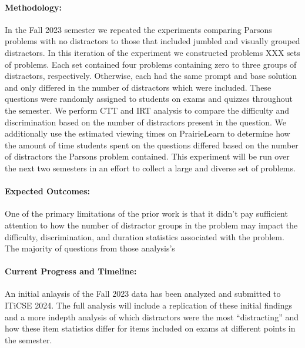 \documentclass[authorversion,nonacm]{acmart}
\begin{document}
\paragraph{Methodology:} In the Fall 2023 semester we repeated the experiments
comparing Parsons problems with no distractors to those that included jumbled
and visually grouped distractors. In this iteration of the experiment we
constructed problems XXX sets of problems. Each set contained four problems
containing zero to three groups of distractors, respectively. Otherwise, each
had the same prompt and base solution and only differed in the number of
distractors which were included. These questions were randomly assigned to
students on exams and quizzes throughout the semester. We perform CTT and IRT
analysis to compare the difficulty and discrimination based on the number of
distractors present in the question. We additionally use the estimated viewing
times on PrairieLearn to determine how the amount of time students spent on the
questions differed based on the number of distractors the Parsons problem
contained. This experiment will be run over the next two semesters in an 
effort to collect a large and diverse set of problems.


\paragraph{Expected Outcomes:} One of the primary limitations of the prior work
is that it didn't pay sufficient attention to how the number of distractor 
groups in the problem may impact the difficulty, discrimination, and duration
statistics associated with the problem. The majority of questions from those 
analysis's 

\paragraph{Current Progress and Timeline:} 
An initial anlaysis of the Fall 2023 data has been analyzed and submitted to
ITiCSE 2024. The full analysis will include a replication of these initial
findings and a more indepth analysis of which distractors were the most
``distracting'' and how these item statistics differ for items included on
exams at different points in the semester.




\balance

\end{document}
